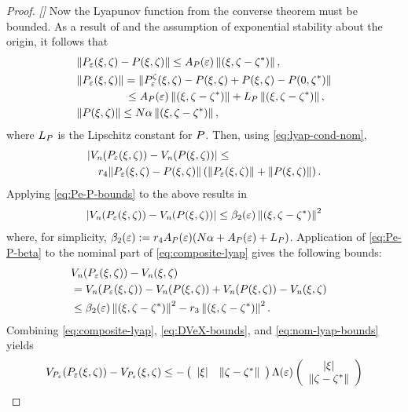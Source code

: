 \begin{proof}{\em []}
  Now the Lyapunov function from the converse theorem must be bounded.
  As a result of  and the assumption of exponential
  stability about the origin, it follows that
  \begin{align}
    \label{eq:Pe-P-bounds}
    &\| \Pe\argsxz - \P\argsxz \| \leq \Ae \nzdxzst,\\
    \nonumber
    &\| \Pe\argsxz \| = \| \Pez\argsxz - \P\argsxz + \P\argsxz - \P\xzst\|\\
    \nonumber
    & \hspace{4.4em} \leq \Ae \nzdxzst  + \LP\nzdxzst,\\
    \nonumber
    &\| \P\argsxz \| \leq N \alpha \nzdxzst,
  \end{align}
  where $\LP$ is the Lipschitz constant for $\P$.
  Then, using \eqref{eq:lyap-cond-nom},
  \begin{align*}
    \lefteqn{| \Vn(\Pe\argsxz) - \Vn(\P\argsxz) | \leq}\\
    &&r_{4} \| \Pe\argsxz - \P\argsxz \| \left( \|\Pe\argsxz\| + \|\P\argsxz\|
    \right).
  \end{align*}
  Applying \eqref{eq:Pe-P-bounds} to the above results in
  \begin{align}
    \label{eq:Pe-P-beta}
    | \Vn(\Pe\argsxz) - \Vn(\P\argsxz) | \leq \bepstwo \nzdxzst^{2}
  \end{align}
  where, for simplicity, $\bepstwo := r_{4} \Ae (N \alpha + \Ae  + \LP)$.
  Application of \eqref{eq:Pe-P-beta} to the nominal part of
  \eqref{eq:composite-lyap} gives the following bounds:
  \begin{align}
    \label{eq:nom-lyap-bounds}
    \lefteqn{\Vn(\Pe\argsxz) - \Vn\argsxz }\\
    \nonumber
    &= \Vn(\Pe\argsxz) - \Vn(\P\argsxz) + \Vn(\P\argsxz) - \Vn\argsxz\\
    \nonumber
    &\leq \bepstwo \nzdxzst^{2} - r_{3} \nzdxzst^{2}.
  \end{align}
  Combining \eqref{eq:composite-lyap}, \eqref{eq:DVeX-bounds}, and
  \eqref{eq:nom-lyap-bounds} yields
  \begin{align*}
    \VP(\Pe\argsxz) - \VP\argsxz \leq - \left(\begin{array}{c c}
        \nzdx & \nzdzst
      \end{array}\right)
    \Le
    \left(\begin{array}{c}
        \nzdx\\
        \nzdzst
      \end{array}\right)

\end{align*}
\end{proof}
